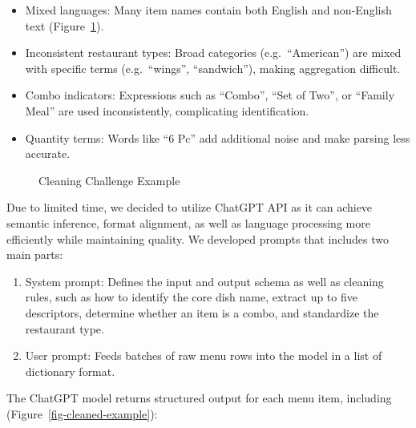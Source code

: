 \documentclass[
  11pt,
  a4paper,
  DIV=11,
  numbers=noendperiod]{scrartcl}
\providecommand{\tightlist}{%
  \setlength{\itemsep}{0pt}\setlength{\parskip}{0pt}}\usepackage{longtable,booktabs,array}
\begin{document}
\begin{itemize}
\tightlist
\item
  Mixed languages: Many item names contain both English and non-English
  text (Figure~\ref{fig-cleaning-challenge}).
\item
  Inconsistent restaurant types: Broad categories (e.g.~``American'')
  are mixed with specific terms (e.g.~``wings'', ``sandwich''), making
  aggregation difficult.
\item
  Combo indicators: Expressions such as ``Combo'', ``Set of Two'', or
  ``Family Meal'' are used inconsistently, complicating identification.
\item
  Quantity terms: Words like ``6 Pc'' add additional noise and make
  parsing less accurate.
\end{itemize}

\begin{figure}

\caption{\label{fig-cleaning-challenge}Cleaning Challenge Example}


\end{figure}%

Due to limited time, we decided to utilize ChatGPT API as it can achieve
semantic inference, format alignment, as well as language processing
more efficiently while maintaining quality. We developed prompts that
includes two main parts:

\begin{enumerate}
\def\labelenumi{\arabic{enumi}.}
\tightlist
\item
  System prompt: Defines the input and output schema as well as cleaning
  rules, such as how to identify the core dish name, extract up to five
  descriptors, determine whether an item is a combo, and standardize the
  restaurant type.
\item
  User prompt: Feeds batches of raw menu rows into the model in a list
  of dictionary format.
\end{enumerate}

The ChatGPT model returns structured output for each menu item,
including (Figure~\ref{fig-cleaned-example}):
\end{document}

